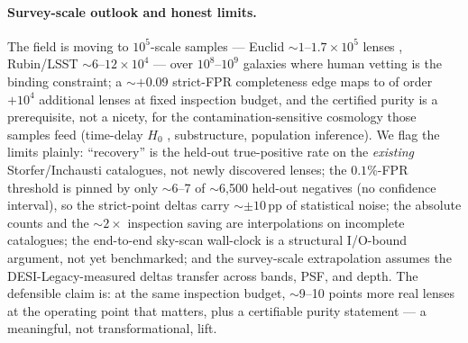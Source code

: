 \documentclass[11pt,letterpaper]{article}
\begin{document}
\paragraph{Survey-scale outlook and honest limits.} The field is moving to
$10^{5}$-scale samples --- Euclid $\sim$$1$--$1.7\times10^{5}$ lenses
\citep{collett2015}, Rubin/LSST $\sim$$6$--$12\times10^{4}$ --- over $10^{8}$--$10^{9}$
galaxies where human vetting is the binding constraint; a $\sim$$+0.09$ strict-FPR
completeness edge maps to of order $+10^{4}$ additional lenses at fixed inspection
budget, and the certified purity is a prerequisite, not a nicety, for the
contamination-sensitive cosmology those samples feed (time-delay $H_0$
\citep{birrer2021tdcosmo}, substructure, population inference). We flag the limits
plainly: ``recovery'' is the held-out true-positive rate on the \emph{existing}
Storfer/Inchausti catalogues, not newly discovered lenses; the $0.1\%$-FPR threshold
is pinned by only $\sim$6--7 of $\sim$6{,}500 held-out negatives (no confidence
interval), so the strict-point deltas carry $\sim$$\pm10$\,pp of statistical noise;
the absolute counts and the $\sim$$2\times$ inspection saving are interpolations on
incomplete catalogues; the end-to-end sky-scan wall-clock is a structural I/O-bound
argument, not yet benchmarked; and the survey-scale extrapolation assumes the
DESI-Legacy-measured deltas transfer across bands, PSF, and depth. The defensible
claim is: at the same inspection budget, $\sim$9--10 points more real lenses at the
operating point that matters, plus a certifiable purity statement --- a meaningful,
not transformational, lift.






\end{document}
